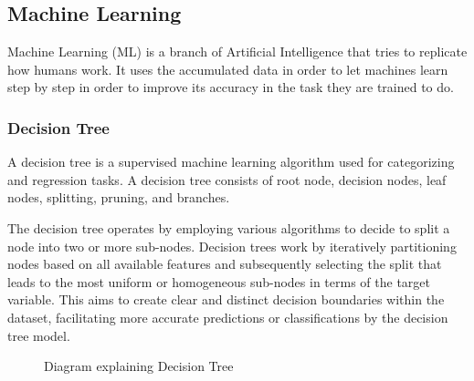 \documentclass[12pt,oneside,openright,a4paper]{cpe-english-project}
\begin{document}
    \subsection{Machine Learning}
      \qquad Machine Learning (ML) is a branch of Artificial Intelligence that tries to replicate how humans work. It uses the accumulated data in order to let machines learn step by step in order to improve its accuracy in the task they are trained to do.\par
        
        \subsubsection{Decision Tree}
          \qquad A decision tree is a supervised machine learning algorithm used for categorizing and regression tasks. A decision tree consists of root node, decision nodes, leaf nodes, splitting, pruning, and branches.\par
          \qquad The decision tree operates by employing various algorithms to decide to split a node into two or more sub-nodes. Decision trees work by iteratively partitioning nodes based on all available features and subsequently selecting the split that leads to the most uniform or homogeneous sub-nodes in terms of the target variable. This aims to create clear and distinct decision boundaries within the dataset, facilitating more accurate predictions or classifications by the decision tree model.\cite{decisiontree1}\par
          \begin{figure}[!h]
            \centering
            \caption{Diagram explaining Decision Tree\cite{decisiontree2}}\label{fig:Decision_Tree}
          \end{figure}
        
\end{document}
